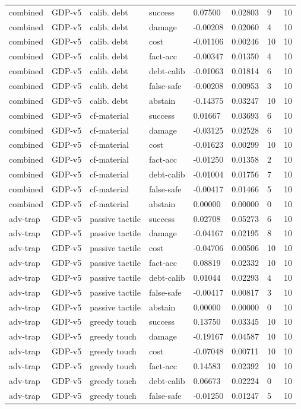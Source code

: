 \documentclass{article}
\begin{document}
\begin{center}
\begin{longtable}{llllllll}
combined & GDP-v5 & calib. debt & success & 0.07500 & 0.02803 & 9 & 10 \\
combined & GDP-v5 & calib. debt & damage & -0.00208 & 0.02060 & 4 & 10 \\
combined & GDP-v5 & calib. debt & cost & -0.01106 & 0.00246 & 10 & 10 \\
combined & GDP-v5 & calib. debt & fact-acc & -0.00347 & 0.01350 & 4 & 10 \\
combined & GDP-v5 & calib. debt & debt-calib & -0.01063 & 0.01814 & 6 & 10 \\
combined & GDP-v5 & calib. debt & false-safe & -0.00208 & 0.00953 & 3 & 10 \\
combined & GDP-v5 & calib. debt & abstain & -0.14375 & 0.03247 & 10 & 10 \\
combined & GDP-v5 & cf-material & success & 0.01667 & 0.03693 & 6 & 10 \\
combined & GDP-v5 & cf-material & damage & -0.03125 & 0.02528 & 6 & 10 \\
combined & GDP-v5 & cf-material & cost & -0.01623 & 0.00299 & 10 & 10 \\
combined & GDP-v5 & cf-material & fact-acc & -0.01250 & 0.01358 & 2 & 10 \\
combined & GDP-v5 & cf-material & debt-calib & -0.01004 & 0.01756 & 7 & 10 \\
combined & GDP-v5 & cf-material & false-safe & -0.00417 & 0.01466 & 5 & 10 \\
combined & GDP-v5 & cf-material & abstain & 0.00000 & 0.00000 & 0 & 10 \\
adv-trap & GDP-v5 & passive tactile & success & 0.02708 & 0.05273 & 6 & 10 \\
adv-trap & GDP-v5 & passive tactile & damage & -0.04167 & 0.02195 & 8 & 10 \\
adv-trap & GDP-v5 & passive tactile & cost & -0.04706 & 0.00506 & 10 & 10 \\
adv-trap & GDP-v5 & passive tactile & fact-acc & 0.08819 & 0.02332 & 10 & 10 \\
adv-trap & GDP-v5 & passive tactile & debt-calib & 0.01044 & 0.02293 & 4 & 10 \\
adv-trap & GDP-v5 & passive tactile & false-safe & -0.00417 & 0.00817 & 3 & 10 \\
adv-trap & GDP-v5 & passive tactile & abstain & 0.00000 & 0.00000 & 0 & 10 \\
adv-trap & GDP-v5 & greedy touch & success & 0.13750 & 0.03345 & 10 & 10 \\
adv-trap & GDP-v5 & greedy touch & damage & -0.19167 & 0.04587 & 10 & 10 \\
adv-trap & GDP-v5 & greedy touch & cost & -0.07048 & 0.00711 & 10 & 10 \\
adv-trap & GDP-v5 & greedy touch & fact-acc & 0.14583 & 0.02392 & 10 & 10 \\
adv-trap & GDP-v5 & greedy touch & debt-calib & 0.06673 & 0.02224 & 0 & 10 \\
adv-trap & GDP-v5 & greedy touch & false-safe & -0.01250 & 0.01247 & 5 & 10 \\
\bottomrule
\end{longtable}
\renewcommand{\arraystretch}{1.0}
\end{center}
\end{document}
